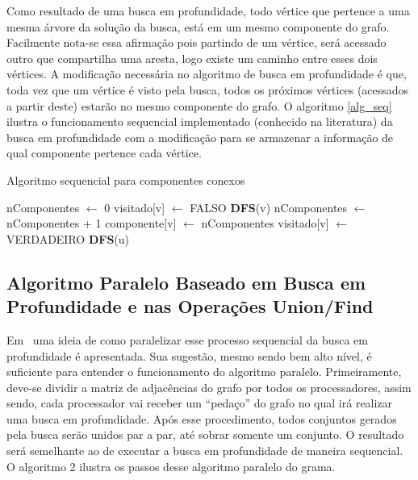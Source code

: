 \documentclass[12pt]{article}
\begin{document}
Como resultado de uma busca em profundidade, todo vértice que pertence a uma mesma árvore da solução da busca, está em um mesmo componente do grafo. Facilmente nota-se essa afirmação pois partindo de um vértice, será acessado outro que compartilha uma aresta, logo existe um caminho entre esses dois vértices. A modificação necessária no algoritmo de busca em profundidade é que, toda vez que um vértice é visto pela busca, todos os próximos vértices (acessados a partir deste) estarão no mesmo componente do grafo. O algoritmo \ref{alg_seq} ilustra o funcionamento sequencial implementado (conhecido na literatura) da busca em profundidade com a modificação para se armazenar a informação de qual componente pertence cada vértice.

\begin{algorithm}[htp!]
    \DontPrintSemicolon
    \caption{Algoritmo sequencial para componentes conexos}
    \label{alg_seq}
	{
        nComponentes $\gets$ 0\;
        {
            visitado[v] $\gets$ FALSO\;
        }
        {
            {
                \textbf{DFS}(v)\;
                nComponentes $\gets$ nComponentes + 1\;
            }
        }
    }
    {
        componente[v] $\gets$ nComponentes\; 
        visitado[v] $\gets$ VERDADEIRO\;
        {
            {
                \textbf{DFS}(u)\;
            }
        }
    }
\end{algorithm}

\subsection{Algoritmo Paralelo Baseado em Busca em Profundidade e nas Operações Union/Find}

Em~\cite{Grama:2003} uma ideia de como paralelizar esse processo sequencial da busca em profundidade é apresentada. Sua sugestão, mesmo sendo bem alto nível, é suficiente para entender o funcionamento do algoritmo paralelo. Primeiramente, deve-se dividir a matriz de adjacências do grafo por todos os processadores, assim sendo, cada processador vai receber um ``pedaço'' do grafo no qual irá realizar uma busca em profundidade. Após esse procedimento, todos conjuntos gerados pela busca serão unidos par a par, até sobrar somente um conjunto. O resultado será semelhante ao de executar a busca em profundidade de maneira sequencial. O algoritmo 2 ilustra os passos desse algoritmo paralelo do grama.
\end{document}
